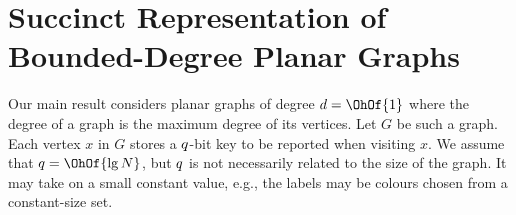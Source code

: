 %
%
%
%
%
%

\section{Succinct Representation of Bounded-Degree Planar Graphs}
\label{sec:graph_rep}


Our main result considers planar graphs of degree $d = \OhOf{1}$
where the degree of a graph is the maximum degree of its vertices.
Let $G$ be such a graph.
Each vertex $x$ in $G$ stores a $q$-bit key
to be reported when visiting $x$.
We assume that $\bitsPerKey = \OhOf{\lg N}$, but
$q$ is not necessarily related to the size of the graph.
It may take on a small constant value, e.g., the labels may be colours
chosen from a constant-size set.


